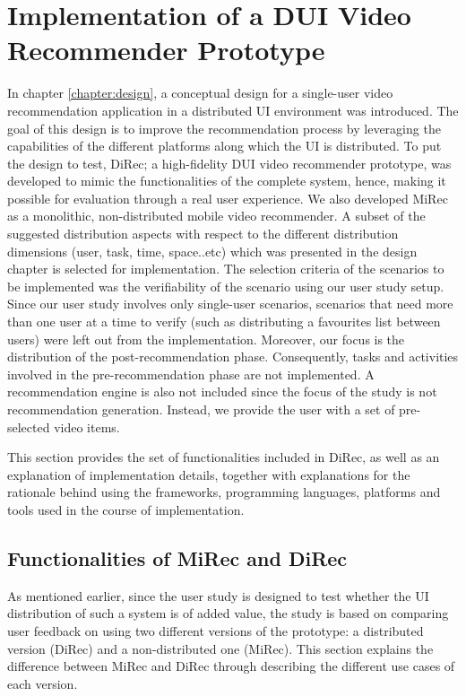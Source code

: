 \chapter{Implementation of a DUI Video Recommender
Prototype}\label{chapter:impl} 
In chapter \ref{chapter:design}, a conceptual design for a single-user video recommendation application in a distributed UI environment was introduced. 
The goal of this design is to improve the recommendation process by leveraging
the capabilities of the different platforms along which the UI is distributed. To put the design to test, DiRec; a high-fidelity DUI video recommender prototype, was developed to mimic the functionalities of the complete system,
hence, making it possible for evaluation through a real user experience. We also
developed MiRec as a monolithic, non-distributed mobile video recommender. A
subset of the suggested distribution aspects with respect to the different distribution dimensions (user, task, time, space..etc) which was presented in the design chapter is selected for implementation.
The selection criteria of the scenarios to be implemented was the verifiability
of the scenario using our user study setup.
Since our user study involves only single-user scenarios, scenarios that need
more than one user at a time to verify (such as distributing a favourites list between users) were left out from the implementation.
Moreover, our focus is the distribution of the post-recommendation phase.
Consequently, tasks and activities involved in the pre-recommendation phase are
not implemented.
A recommendation engine is also not included since the focus of the study is not
recommendation generation. Instead, we provide the user with a set of
pre-selected video items.\par 
This section provides the set of functionalities included in DiRec, as well as
an explanation of implementation details, together with explanations for the
rationale behind using the frameworks, programming languages, platforms and
tools used in the course of implementation.
 
\section{Functionalities of MiRec and DiRec}
As mentioned earlier, since the user study is designed to test whether the UI
distribution of such a system is of added value, the study is based on comparing user feedback on using two different versions of the prototype: a distributed
version (DiRec) and a non-distributed one (MiRec). This section explains the
difference between MiRec and DiRec through describing the different use cases of each version.
